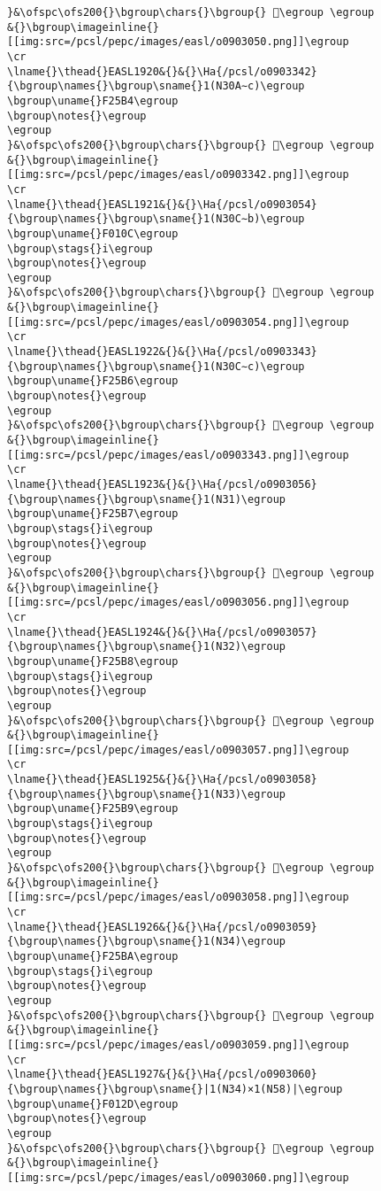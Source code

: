 \begin{verbatim}
}&\ofspc\ofs200{}\bgroup\chars{}\bgroup{} 󲖳\egroup \egroup
&{}\bgroup\imageinline{}[[img:src=/pcsl/pepc/images/easl/o0903050.png]]\egroup
\cr
\lname{}\thead{}EASL1920&{}&{}\Ha{/pcsl/o0903342}{\bgroup\names{}\bgroup\sname{}1(N30A∼c)\egroup
\bgroup\uname{}F25B4\egroup
\bgroup\notes{}\egroup
\egroup
}&\ofspc\ofs200{}\bgroup\chars{}\bgroup{} 󲖴\egroup \egroup
&{}\bgroup\imageinline{}[[img:src=/pcsl/pepc/images/easl/o0903342.png]]\egroup
\cr
\lname{}\thead{}EASL1921&{}&{}\Ha{/pcsl/o0903054}{\bgroup\names{}\bgroup\sname{}1(N30C∼b)\egroup
\bgroup\uname{}F010C\egroup
\bgroup\stags{}i\egroup
\bgroup\notes{}\egroup
\egroup
}&\ofspc\ofs200{}\bgroup\chars{}\bgroup{} 󰄌\egroup \egroup
&{}\bgroup\imageinline{}[[img:src=/pcsl/pepc/images/easl/o0903054.png]]\egroup
\cr
\lname{}\thead{}EASL1922&{}&{}\Ha{/pcsl/o0903343}{\bgroup\names{}\bgroup\sname{}1(N30C∼c)\egroup
\bgroup\uname{}F25B6\egroup
\bgroup\notes{}\egroup
\egroup
}&\ofspc\ofs200{}\bgroup\chars{}\bgroup{} 󲖶\egroup \egroup
&{}\bgroup\imageinline{}[[img:src=/pcsl/pepc/images/easl/o0903343.png]]\egroup
\cr
\lname{}\thead{}EASL1923&{}&{}\Ha{/pcsl/o0903056}{\bgroup\names{}\bgroup\sname{}1(N31)\egroup
\bgroup\uname{}F25B7\egroup
\bgroup\stags{}i\egroup
\bgroup\notes{}\egroup
\egroup
}&\ofspc\ofs200{}\bgroup\chars{}\bgroup{} 󲖷\egroup \egroup
&{}\bgroup\imageinline{}[[img:src=/pcsl/pepc/images/easl/o0903056.png]]\egroup
\cr
\lname{}\thead{}EASL1924&{}&{}\Ha{/pcsl/o0903057}{\bgroup\names{}\bgroup\sname{}1(N32)\egroup
\bgroup\uname{}F25B8\egroup
\bgroup\stags{}i\egroup
\bgroup\notes{}\egroup
\egroup
}&\ofspc\ofs200{}\bgroup\chars{}\bgroup{} 󲖸\egroup \egroup
&{}\bgroup\imageinline{}[[img:src=/pcsl/pepc/images/easl/o0903057.png]]\egroup
\cr
\lname{}\thead{}EASL1925&{}&{}\Ha{/pcsl/o0903058}{\bgroup\names{}\bgroup\sname{}1(N33)\egroup
\bgroup\uname{}F25B9\egroup
\bgroup\stags{}i\egroup
\bgroup\notes{}\egroup
\egroup
}&\ofspc\ofs200{}\bgroup\chars{}\bgroup{} 󲖹\egroup \egroup
&{}\bgroup\imageinline{}[[img:src=/pcsl/pepc/images/easl/o0903058.png]]\egroup
\cr
\lname{}\thead{}EASL1926&{}&{}\Ha{/pcsl/o0903059}{\bgroup\names{}\bgroup\sname{}1(N34)\egroup
\bgroup\uname{}F25BA\egroup
\bgroup\stags{}i\egroup
\bgroup\notes{}\egroup
\egroup
}&\ofspc\ofs200{}\bgroup\chars{}\bgroup{} 󲖺\egroup \egroup
&{}\bgroup\imageinline{}[[img:src=/pcsl/pepc/images/easl/o0903059.png]]\egroup
\cr
\lname{}\thead{}EASL1927&{}&{}\Ha{/pcsl/o0903060}{\bgroup\names{}\bgroup\sname{}|1(N34)×1(N58)|\egroup
\bgroup\uname{}F012D\egroup
\bgroup\notes{}\egroup
\egroup
}&\ofspc\ofs200{}\bgroup\chars{}\bgroup{} 󰄭\egroup \egroup
&{}\bgroup\imageinline{}[[img:src=/pcsl/pepc/images/easl/o0903060.png]]\egroup

\end{verbatim}

